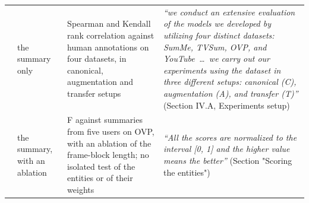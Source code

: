 \begin{table}[p]
\begin{tabular}{@{}>{\raggedright\arraybackslash}p{2.1cm}>{\raggedright\arraybackslash}p{2.4cm}>{\raggedright\arraybackslash}p{3.5cm}>{\raggedright\arraybackslash}p{3.6cm}@{}}
\rowcolor{perf2!45}\citet{huang2024aesthetic} & the summary only & Spearman and Kendall rank correlation against human annotations on four datasets, in canonical, augmentation and transfer setups & \emph{``we conduct an extensive evaluation of the models we developed by utilizing four distinct datasets: SumMe, TVSum, OVP, and YouTube \,\ldots\, we carry out our experiments using the dataset in three different setups: canonical (C), augmentation (A), and transfer (T)''} \textnormal{(Section IV.A, Experiments setup)} \\
\rowcolor{perf3!55}\citet{xu2024property} & the summary, with an ablation & F against summaries from five users on OVP, with an ablation of the frame-block length; no isolated test of the entities or of their weights & \emph{``All the scores are normalized to the interval [0, 1] and the higher value means the better''} \textnormal{(Section "Scoring the entities")} \\
\midrule
\bottomrule
\end{tabular}
\end{table}
